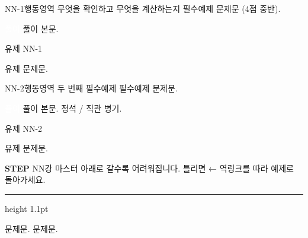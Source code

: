 \vfill
{}

\vfill
{}
\newpage

\begin{mainex}{NN-1}{행동영역 \; 무엇을 확인하고 무엇을 계산하는지}
필수예제 문제문 (4점 중반).


{\sffamily\footnotesize\colorbox{ink}{\textcolor{white}{\cjkbold 풀이}}}\quad
풀이 본문.
\end{mainex}

\par\vspace{8mm}\noindent
{\sffamily\cjkbold\textcolor{prime}{유제 NN-1}}\; \chips
\par\vspace{2mm}
유제 문제문.
\vfill
{}
\newpage

\begin{mainex}{NN-2}{행동영역 \; 두 번째 필수예제}
필수예제 문제문.


{\sffamily\footnotesize\colorbox{ink}{\textcolor{white}{\cjkbold 풀이}}}\quad
풀이 본문. \lbljs\; 정석 / \lbldg\; 직관 병기.
\end{mainex}

\par\vspace{8mm}\noindent
{\sffamily\cjkbold\textcolor{prime}{유제 NN-2}}\; \chips
\par\vspace{2mm}
유제 문제문.
\vfill
{}
\newpage
{}

{\sffamily\fontsize{15}{18}\selectfont\textcolor{prime}{\textbf{STEP}}\hspace{2mm}%
 {\cjkblack\fontsize{13.5}{17}\selectfont\textcolor{ink}{NN강 마스터}}}%
\hfill{\sffamily\fontsize{8}{10}\selectfont\textcolor{gray60}{\cjkmed 아래로 갈수록 어려워집니다. \;틀리면 ← 역링크를 따라 예제로 돌아가세요.}}\par
\vspace{2.4mm}
{\color{prime}\hrule height 1.1pt}
\vspace{6mm}

\noindent
{}
문제문.
\vfill
{}
\rowrule
\vspace{5mm}
\noindent
{}
문제문.
\vfill
{}
\newpage
{}

